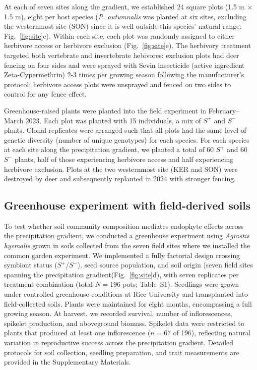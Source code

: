 \documentclass[12pt]{article}\usepackage[]{graphicx}\usepackage[dvipsnames]{xcolor}
\begin{document}
At each of seven sites along the gradient, we established 24 square plots (1.5 m $\times$ 1.5 m), eight per host species (\textit{P. autumnalis} was planted at six sites, excluding the westernmost site (SON) since it is well outside this species' natural range: Fig.~\ref{fig:site}c). 
Within each site, each plot was randomly assigned to either herbivore access or herbivore exclusion (Fig.~\ref{fig:site}e). 
The herbivory treatment targeted both vertebrate and invertebrate hebivores: exclusion plots had deer fencing on four sides and were sprayed with Sevin insecticide (active ingredient Zeta-Cypermethrin) 2-3 times per growing season following the manufacturer's protocol; herbivore access plots were unsprayed and fenced on two sides to control for any fence effect.

Greenhouse-raised plants were planted into the field experiment in February--March 2023.
Each plot was planted with 15 individuals, a mix of $S^+$ and $S^-$ plants. 
Clonal replicates were arranged such that all plots had the same level of genetic diversity (number of unique genotypes) for each species.  
For each species at each site along the precipitation gradient, we planted a total of 60 $S^+$ and 60 $S^-$ plants, half of those experiencing herbivore access and half experiencing herbivore exclusion. 
Plots at the two westernmost site (KER and SON) were destroyed by deer and subsequently replanted in 2024 with stronger fencing. 

\subsection*{Greenhouse experiment with field-derived soils}
To test whether soil community composition mediates endophyte effects across the precipitation gradient, we conducted a greenhouse experiment using \textit{Agrostis hyemalis} grown in soils collected from the seven field sites where we installed the common garden experiment.
We implemented a fully factorial design crossing symbiont status ($S^{+}$/$S^{-}$), seed source population, and soil origin (seven field sites spanning the precipitation gradient(Fig.~\ref{fig:site}d), with seven replicates per treatment combination (total $N = 196$ pots; Table~S1).
Seedlings were grown under controlled greenhouse conditions at Rice University and transplanted into field-collected soils. 
Plants were maintained for eight months, encompassing a full growing season.
At harvest, we recorded survival, number of inflorescences, spikelet production, and aboveground biomass. 
Spikelet data were restricted to plants that produced at least one inflorescence ($n = 67$ of 196), reflecting natural variation in reproductive success across the
precipitation gradient.
Detailed protocols for soil collection, seedling preparation, and trait measurements are provided in the Supplementary Materials.
\end{document}
